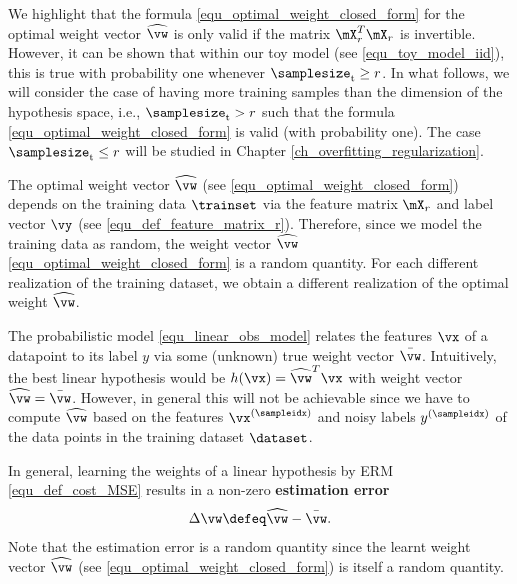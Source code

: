 \documentclass[12pt]{report}
\begin{document}
We highlight that the formula \eqref{equ_optimal_weight_closed_form} 
for the optimal weight vector $\widehat{\vw}$ is only valid if the matrix 
$\mX^{T}_{r} \mX_{r}$ is invertible. However, it can be shown that within 
our toy model (see \eqref{equ_toy_model_iid}), this is true with probability 
one whenever $\samplesize_{\rm t} \geq r$. In what follows, we will consider 
the case of having more training samples than the dimension of the 
hypothesis space, i.e., $\samplesize_{\rm t} > r$ such that the formula 
\eqref{equ_optimal_weight_closed_form} is valid (with probability one). 
The case $\samplesize_{\rm t} \leq r$ will be studied in Chapter \ref{ch_overfitting_regularization}.

The optimal weight vector $\widehat{\vw}$ (see \eqref{equ_optimal_weight_closed_form}) 
depends on the training data $\trainset$ via the feature matrix $\mX_{r}$ 
and label vector $\vy$ (see \eqref{equ_def_feature_matrix_r}). Therefore, 
since we model the training data as random, the weight vector $\widehat{\vw}$ 
\eqref{equ_optimal_weight_closed_form} is a random quantity. For each different 
realization of the training dataset, we obtain a different realization of the 
optimal weight $\widehat{\vw}$. 

The probabilistic model \eqref{equ_linear_obs_model} relates the features 
$\vx$ of a datapoint to its label $y$ via some (unknown) true weight vector $\bar{\vw}$. 
Intuitively, the best linear hypothesis would be $h(\vx) =\widehat{\vw}^{T} \vx$ with 
weight vector $\widehat{\vw} = \bar{\vw}$. However, in general this will not be 
achievable since we have to compute $\widehat{\vw}$ based on the features 
$\vx^{(\sampleidx)}$ and noisy labels $y^{(\sampleidx)}$ of the data 
points in the training dataset $\dataset$. 

In general, learning the weights of a linear hypothesis by ERM \eqref{equ_def_cost_MSE} 
results in a non-zero {\bf estimation error}
\begin{equation}
\label{equ_def_est_error}
\Delta \vw \defeq \widehat{\vw} - \bar{\vw}. 
\end{equation} 
Note that the estimation error is a random quantity since the 
learnt weight vector $\widehat{\vw}$ (see \eqref{equ_optimal_weight_closed_form}) 
is itself a random quantity.
\end{document}
